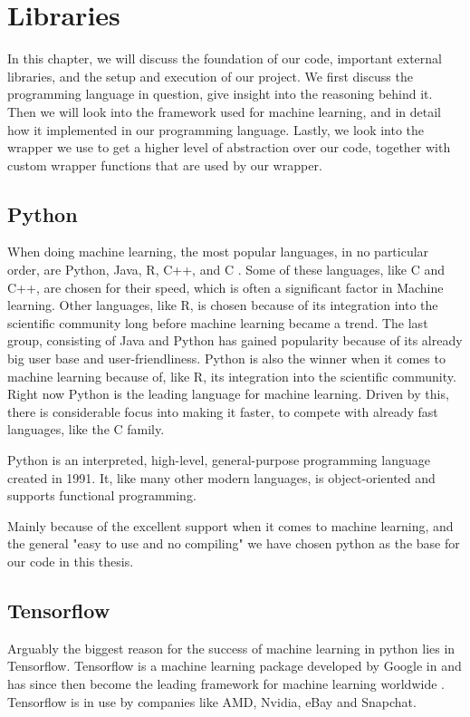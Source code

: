 \section{Libraries} 
In this chapter, we will discuss the foundation of our code, important external libraries, and the setup and execution of our project.  
We first discuss the programming language in question, give insight into the reasoning behind it. Then we will look into the framework used for machine learning, and in detail how it implemented in our programming language. Lastly, we look into the wrapper we use to get a higher level of abstraction over our code, together with custom wrapper functions that are used by our wrapper. 

\subsection{Python}
When doing machine learning, the most popular languages, in no particular order, are Python, Java, R, C++, and C . Some of these languages, like C and C++, are chosen for their speed, which is often a significant factor in Machine learning. Other languages, like R, is chosen because of its integration into the scientific community long before machine learning became a trend. The last group, consisting of Java and Python has gained popularity because of its already big user base and user-friendliness. Python is also the winner when it comes to machine learning because of, like R, its integration into the scientific community. 
Right now Python is the leading language for machine learning. Driven by this, there is considerable focus into making it faster, to compete with already fast languages, like the C family. 

Python is an interpreted, high-level, general-purpose programming language created in 1991.   It, like many other modern languages, is object-oriented and supports functional programming. 

Mainly because of the excellent support when it comes to machine learning, and the general "easy to use and no compiling" we have chosen python as the base for our code in this thesis. 



\subsection{Tensorflow}
Arguably the biggest reason for the success of machine learning in python lies in Tensorflow. Tensorflow is a machine learning package developed by Google in  and has since then become the leading framework for machine learning worldwide .  
Tensorflow is in use by companies like AMD, Nvidia, eBay and Snapchat. 


